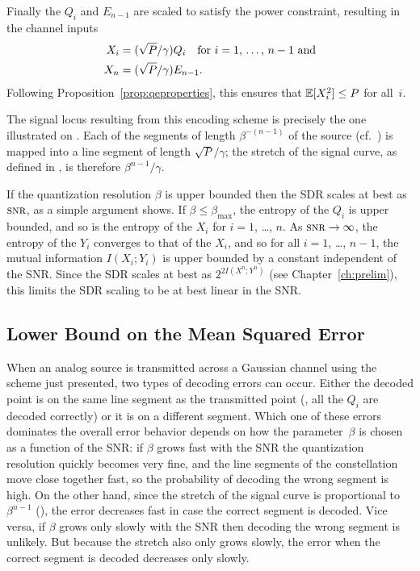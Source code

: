 Finally the $Q_i$ and $E_{n-1}$ are scaled to satisfy the power constraint,
resulting in the channel inputs
\begin{align}
  X_i &= (\sqrt{P}/\gamma) Q_i \quad
  \text{for $i = 1$, \dots, $n-1$ and} \nonumber\\
  X_n &= (\sqrt{P}/\gamma) E_{n-1}.
  \label{eq:Xdef}
\end{align}
Following Proposition~\ref{prop:qeproperties}, this ensures that $\mathbb{E}[X_i^2] \le
P$ for all~$i$. 

\begin{remark}
  \label{rem:sqgeometry}
  The signal locus resulting from this encoding scheme is precisely the one
  illustrated on . Each of the segments of length
  $\beta^{-(n-1)}$ of the source (cf.~) is mapped into a
  line segment of length $\sqrt{P}/\gamma$; the stretch of the signal curve, as
  defined in , is therefore $\beta^{n-1}/\gamma$.
\end{remark}

\begin{remark}
  \label{rem:betagrow}
  If the quantization resolution $\beta$ is upper bounded then the SDR scales at
  best as $\snr$, as a simple argument shows. If $\beta \le \beta_{\max}$, the
  entropy of the $Q_i$ is upper bounded, and so is the entropy of the $X_i$ for
  $i = 1$, \ldots, $n$. As $\snr \goesto \infty$, the entropy of the $Y_i$
  converges to that of the $X_i$, and so for all $i = 1$, \ldots, $n-1$, the
  mutual information $I(X_i; Y_i)$ is upper bounded by a constant independent of
  the SNR. Since the SDR scales at best as $2^{2I(X^n;Y^n)}$ (see
  Chapter~\ref{ch:prelim}), this limits the SDR scaling to be at best linear in
  the SNR.
\end{remark}


\subsection{Lower Bound on the Mean Squared Error}\label{sec:scalarlowerbound}

When an analog source is transmitted across a Gaussian channel using the scheme
just presented, two types of decoding errors can occur. Either the decoded point
is on the same line segment as the transmitted point (\ie, all the $Q_i$ are
decoded correctly) or it is on a different segment. Which one of these errors
dominates the overall error behavior depends on how the parameter~$\beta$ is
chosen as a function of the SNR: if $\beta$ grows fast with the SNR the
quantization resolution quickly becomes very fine, and the line segments of the
constellation move close together fast, so the probability of decoding the wrong
segment is high. On the other hand, since the stretch of the signal curve is
proportional to~$\beta^{n-1}$ (), the error decreases fast in
case the correct segment is decoded. Vice versa, if $\beta$ grows only slowly
with the SNR then decoding the wrong segment is unlikely. But because the
stretch also only grows slowly, the error when the correct segment is decoded
decreases only slowly.

